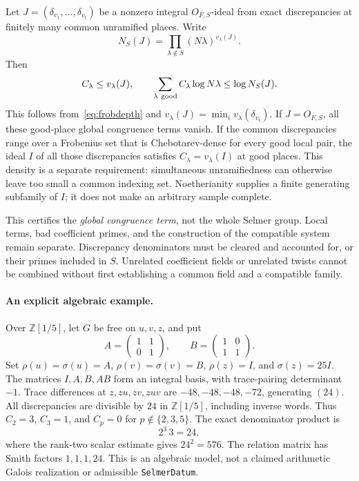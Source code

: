 Let \(J=(\delta_{v_1},\ldots,\delta_{v_t})\) be a nonzero integral
\(O_{F,S}\)-ideal from exact discrepancies at finitely many common
unramified places. Write
\[
 N_S(J)=\prod_{\lambda\notin S}(N\lambda)^{v_\lambda(J)}.
\]
Then
\begin{equation}
\label{eq:idealbound}
 C_\lambda\leq v_\lambda(J),\qquad
 \sum_{\lambda\ {\rm good}}C_\lambda\log N\lambda
 \leq \log N_S(J).
\end{equation}
This follows from~\eqref{eq:frobdepth} and
\(v_\lambda(J)=\min_i v_\lambda(\delta_{v_i})\).
If \(J=O_{F,S}\), all these good-place global congruence terms vanish.
If the common discrepancies range over a Frobenius set that is
Chebotarev-dense for every good local pair, the ideal \(I\) of all
those discrepancies satisfies \(C_\lambda=v_\lambda(I)\) at good
places. This density is a separate requirement: simultaneous
unramifiedness can otherwise leave too small a common indexing set.
Noetherianity supplies a finite generating subfamily of \(I\); it does
not make an arbitrary sample complete.

This certifies the \emph{global congruence term}, not the whole Selmer
group. Local terms, bad coefficient primes, and the construction of the
compatible system remain separate. Discrepancy denominators must be
cleared and accounted for, or their primes included in \(S\).
Unrelated coefficient fields or unrelated twists cannot be combined
without first establishing a common field and a compatible family.

\paragraph{An explicit algebraic example.}
Over \(\mathbb Z[1/5]\), let \(G\) be free on \(u,v,z\), and put
\[
 A=\begin{pmatrix}1&1\\0&1\end{pmatrix},\qquad
 B=\begin{pmatrix}1&0\\1&1\end{pmatrix}.
\]
Set \(\rho(u)=\sigma(u)=A\), \(\rho(v)=\sigma(v)=B\),
\(\rho(z)=I\), and \(\sigma(z)=25I\).
The matrices \(I,A,B,AB\) form an integral basis, with trace-pairing
determinant \(-1\). Trace differences at \(z,zu,zv,zuv\) are
\(-48,-48,-48,-72\), generating \((24)\).
All discrepancies are divisible by \(24\) in \(\mathbb Z[1/5]\),
including inverse words. Thus \(C_2=3\), \(C_3=1\), and \(C_p=0\)
for \(p\notin\{2,3,5\}\). The exact denominator product is
\[
 2^3\,3=24,
\]
where the rank-two scalar estimate gives \(24^2=576\).
The relation matrix has Smith factors \(1,1,1,24\).
This is an algebraic model, not a claimed arithmetic Galois realization
or admissible \texttt{SelmerDatum}.
